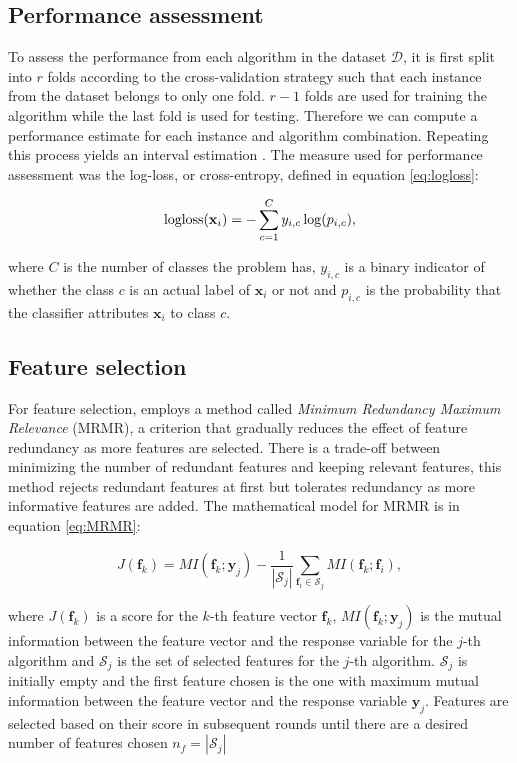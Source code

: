 \newpage
\subsection{Performance assessment}

To assess the performance from each algorithm in the dataset $\mathcal{D}$, it is first split into $r$ folds according to the cross-validation strategy such that each instance from the dataset belongs to only one fold. $r-1$ folds are used for training the algorithm while the last fold is used for testing. Therefore we can compute a performance estimate for each instance and algorithm combination. Repeating this process yields an interval estimation \cite{Lorena2022}. The measure used for performance assessment was the log-loss, or cross-entropy, defined in equation \ref{eq:logloss}:

\begin{equation} \label{eq:logloss}
	\logloss(\mathbf{x}_i) = - \sum_{c=1}^{C} y_{i, c} \log(p_{i, c}),
\end{equation}

where $C$ is the number of classes the problem has, $y_{i, c}$ is a binary indicator of whether the class $c$ is an actual label of $\mathbf{x}_i$ or not and $p_{i, c}$ is the probability that the classifier attributes $\mathbf{x}_i$ to class $c$.

\subsection{Feature selection}

For feature selection, \cite{Lorena2022} employs a method called \emph{Minimum Redundancy Maximum Relevance} (MRMR), a criterion that gradually reduces the effect of feature redundancy as more features are selected. There is a trade-off between minimizing the number of redundant features and keeping relevant features, this method rejects redundant features at first but tolerates redundancy as more informative features are added. The mathematical model for MRMR is in equation \ref{eq:MRMR}:

\begin{equation} \label{eq:MRMR}
	J(\mathbf{f}_k) = MI(\mathbf{f}_k; \mathbf{y}_j) - \frac{1}{|\mathcal{S}_j|} \sum_{\mathbf{f}_i \in \mathcal{S}_j} MI(\mathbf{f}_k; \mathbf{f}_i),
\end{equation}

where $J(\mathbf{f}_k)$ is a score for the $k$-th feature vector $\mathbf{f}_k$, $ MI(\mathbf{f}_k; \mathbf{y}_j)$ is the mutual information between the feature vector and the response variable for the $j$-th algorithm and $\mathcal{S}_j$ is the set of selected features for the $j$-th algorithm. $\mathcal{S}_j$ is initially empty and the first feature chosen is the one with maximum mutual information between the feature vector and the response variable $\mathbf{y}_j$. Features are selected based on their score in subsequent rounds until there are a desired number of features chosen $n_f = |\mathcal{S}_j|$

